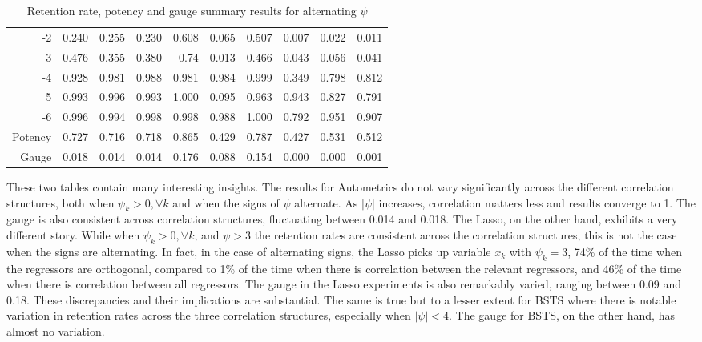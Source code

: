 \begin{landscape}
\begin{table}[htbp]
\begin{tabular}{r|rrr|rrr|rrr}
    -2    & 0.240  & 0.255 & 0.230  & 0.608 & 0.065 & 0.507 & 0.007 & 0.022 & 0.011 \\
    3     & 0.476 & 0.355 & 0.380  & 0.74  & 0.013 & 0.466 & 0.043 & 0.056 & 0.041 \\
    -4    & 0.928 & 0.981 & 0.988 & 0.981 & 0.984 & 0.999 & 0.349 & 0.798 & 0.812 \\
    5     & 0.993 & 0.996 & 0.993 & 1.000     & 0.095 & 0.963 & 0.943 & 0.827 & 0.791 \\
    -6    & 0.996 & 0.994 & 0.998 & 0.998 & 0.988 & 1.000     & 0.792 & 0.951 & 0.907 \\
    \hline
    Potency & 0.727 & 0.716 & 0.718 & 0.865 & 0.429 & 0.787 & 0.427 & 0.531 & 0.512 \\
    Gauge & 0.018 & 0.014 & 0.014 & 0.176 & 0.088 & 0.154 & 0.000 & 0.000 & 0.001 \\

    \end{tabular}%
  
    \caption{Retention rate, potency and gauge summary results for alternating $\psi$}
    \label{tab:SummaryAlt}%
\end{table}%

\end{landscape}

These two tables contain many interesting insights. The results for Autometrics do not vary significantly across the different correlation structures, both when $\psi_{k}>0,\forall k$ and when the signs of $\psi$ alternate. As $|\psi|$ increases, correlation matters less and results converge to 1. The gauge is also consistent across correlation structures, fluctuating between 0.014 and 0.018.  The Lasso, on the other hand, exhibits a very different story. While when $\psi_{k}>0, \forall k$, and $\psi>3$ the retention rates are consistent across the correlation structures, this is not the case when the signs are alternating. In fact, in the case of alternating signs, the Lasso picks up variable $x_{k}$ with $\psi_{k}=3$, 74\% of the time when the regressors are orthogonal, compared to 1\% of the time when there is correlation between the relevant regressors, and 46\% of the time when there is correlation between all regressors. The gauge in the Lasso experiments is also remarkably varied, ranging between 0.09 and 0.18. These discrepancies and their implications are substantial. The same is true but to a lesser extent for BSTS where there is notable variation in retention rates across the three correlation structures, especially when $|\psi|<4$. The gauge for BSTS, on the other hand, has almost no variation.

